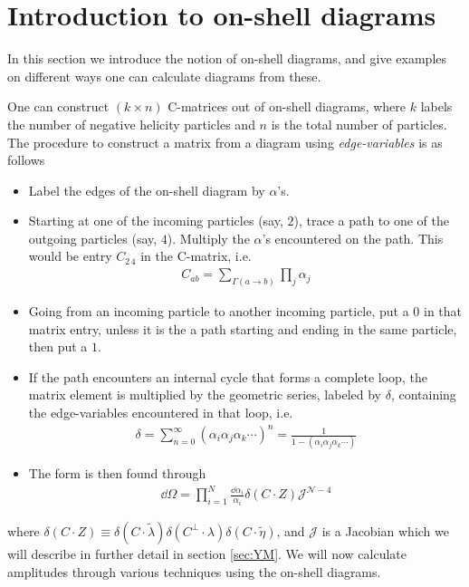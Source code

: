 \documentclass[letter,11pt]{article}
\begin{document}
\section{Introduction to on-shell diagrams}\label{sec:on-she-intro}
In this section we introduce the notion of on-shell diagrams, and give examples on different ways one can calculate diagrams from these. 

One can construct $(k\times n)$ C-matrices out of on-shell diagrams, where $k$ labels the number of negative helicity particles and $n$ is the total number of particles. The procedure to construct a matrix from a diagram using \textit{edge-variables} is as follows
\begin{itemize}
	\item Label the edges of the on-shell diagram by $\alpha$'s.
	\item Starting at one of the incoming particles (say, $2$), trace a path to one of the outgoing particles  (say, $4$). Multiply the $\alpha$'s encountered on the path. This would be entry $C_{2\,4}$ in the C-matrix, i.e.
	\begin{equation}
		\begin{aligned}
			C_{ab}=\sum_{\Gamma(a\to b)}\prod_j\alpha_j
		\end{aligned}
	\end{equation}
	\item Going from an incoming particle to another incoming particle, put a $0$ in that matrix entry, unless it is the a path starting and ending in the same particle, then put a $1$.
	\item If the path encounters an internal cycle that forms a complete loop, the matrix element is multiplied by the geometric series, labeled by $\delta$, containing the edge-variables encountered in that loop, i.e.
	\begin{equation}
		\begin{aligned}
			\delta=\sum_{n=0}^\infty (\alpha_i \alpha_j\alpha_k \cdots)^n=\frac{1}{1- (\alpha_i \alpha_j\alpha_k \cdots)}
		\end{aligned}
	\end{equation}
	\item The form is then found through
	\begin{equation}
		\begin{aligned}
			\dd \Omega =\prod_{i=1}^{N}\frac{\dd \alpha_i}{\alpha_i}\delta(C\cdot Z)\mathcal{J}^{\mathcal{N}-4}
		\end{aligned}
	\end{equation}
\end{itemize} 
where $\delta(C\cdot Z)\equiv\delta(C\cdot \tilde \lambda) \delta(C^\perp\cdot \lambda)\delta(C\cdot \tilde \eta)$, and $\mathcal{J}$ is a Jacobian which we will describe in further detail in section \ref{sec:YM}.
We will now calculate amplitudes through various techniques using the on-shell diagrams. 
\end{document}
